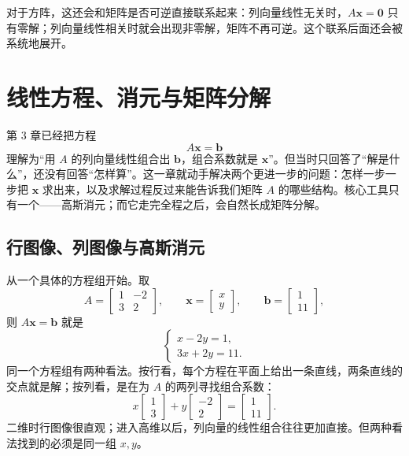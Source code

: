 \documentclass[UTF8,a4paper,12pt]{ctexart}
\numberwithin{equation}{section}
\begin{document}
	对于方阵，这还会和矩阵是否可逆直接联系起来：列向量线性无关时，$A\bm{x}=\bm{0}$ 只有零解；列向量线性相关时就会出现非零解，矩阵不再可逆。这个联系后面还会被系统地展开。
	\section{线性方程、消元与矩阵分解}
	
	第 3 章已经把方程
	\begin{equation}\label{eq:4.1}
	A\bm{x}=\bm{b}
	\end{equation}
	理解为“用 $A$ 的列向量线性组合出 $\bm{b}$，组合系数就是 $\bm{x}$”。但当时只回答了“解是什么”，还没有回答“怎样算”。这一章就动手解决两个更进一步的问题：怎样一步一步把 $\bm{x}$ 求出来，以及求解过程反过来能告诉我们矩阵 $A$ 的哪些结构。核心工具只有一个——高斯消元；而它走完全程之后，会自然长成矩阵分解。
	
	\subsection{行图像、列图像与高斯消元}
	
	从一个具体的方程组开始。取
	\begin{equation}\label{eq:4.2}
	A=
	\begin{bmatrix}
		1&-2\\
		3&2
	\end{bmatrix},
	\qquad
	\bm{x}=
	\begin{bmatrix}
		x\\y
	\end{bmatrix},
	\qquad
	\bm{b}=
	\begin{bmatrix}
		1\\11
	\end{bmatrix},
	\end{equation}
	则 $A\bm{x}=\bm{b}$ 就是
	\begin{equation}\label{eq:4.3}
	\begin{cases}
		x-2y=1,\\
		3x+2y=11.
	\end{cases}
	\end{equation}
	同一个方程组有两种看法。按行看，每个方程在平面上给出一条直线，两条直线的交点就是解；按列看，是在为 $A$ 的两列寻找组合系数：
	\begin{equation}\label{eq:4.4}
	x
	\begin{bmatrix}
		1\\3
	\end{bmatrix}
	+y
	\begin{bmatrix}
		-2\\2
	\end{bmatrix}
	=
	\begin{bmatrix}
		1\\11
	\end{bmatrix}.
	\end{equation}
	二维时行图像很直观；进入高维以后，列向量的线性组合往往更加直接。但两种看法找到的必须是同一组 $x,y$。
	
\end{document}
